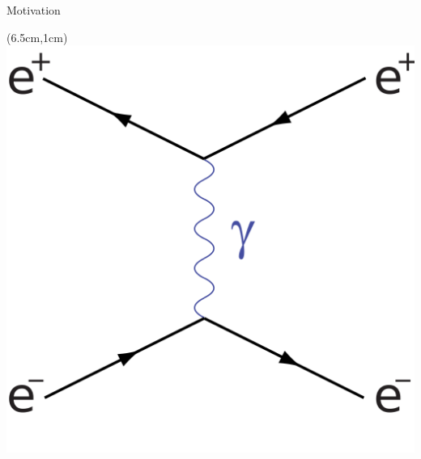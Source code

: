 \documentclass[8pt]{beamer}
\begin{document}
\begin{frame}{Motivation}
\begin{textblock*}{3cm}(6.5cm,1cm)
	\includegraphics[width=\textwidth]{VBilder/bhabhaT}
\end{textblock*}


\end{frame}
\end{document}
